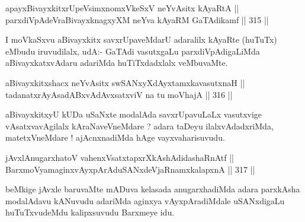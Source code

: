 \begin{shl}
apayxBivayxkitxrUpeV\s simxnomxVkeSxV neYvAsitx kAyaRtA || \\
parxdiVpAdeVraBivayxknagxyXM neYva kAyaRM GaTAdikamf ||  315 ||  
\end{shl}

\begin{artha}
I moVkaSxvu aBivayxkitx savxrUpaveMdarU adaralilx kAyaRte (huTuTx)
eMbudu iruvudilalx, udA:- GaTAdi vasutxgaLu parxdiVpAdigaLiMda
aBivayxkatxvAdaru adariMda huTiTxdadxlalx veMbuvaMte.
\end{artha}


\begin{shl}
\footnotemark[1]aBivayxkitxshacx neYvAsitx swSANxyXdAyxtamxkavasutxnaH || \\
tadanatxrAyAsadABxvAdAvxsatxviV na tu moVhajA ||  316 ||  
\end{shl}

\begin{artha}
aBivayxkitxyU kUDa uSaNxte modalAda savxrUpavuLaLx
vasutxvige vAsatxvavAgilalx kAraNaveVneMdare ? adara taDeyu
ilalxvAdadxriMda, matetxVneMdare ! ajAcnxnadiMda hAge
vayxvaharisuvudu.
\end{artha}

\begin{shl}
jAvxlAnugarxhatoV vahenxVsatxtapxrXkAshAdidashaRnAtf || \\
BarxmoV\s yamaginxvAyxpArAduSANxdeVjaRnamxkalapxnA ||  317 ||  
\end{shl}

\begin{artha}
beMkige jAvxle baruvaMte mADuva kelasada anugarxhadiMda adara
parxkAsha modalAdavu kANuvudu adariMda aginxya vAyxpAradiMdale
uSANxdigaLu huTuTxvudeMdu kalipxsuvudu Barxmeye idu.
\end{artha}

